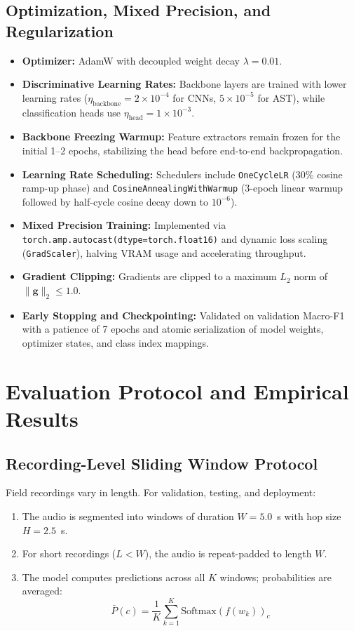 \documentclass[11pt,a4paper]{article}
\begin{document}
\subsection{Optimization, Mixed Precision, and Regularization}
\begin{itemize}[leftmargin=*]
    \item \textbf{Optimizer:} AdamW with decoupled weight decay $\lambda = 0.01$.
    \item \textbf{Discriminative Learning Rates:} Backbone layers are trained with lower learning rates ($\eta_{\text{backbone}} = 2 \times 10^{-4}$ for CNNs, $5 \times 10^{-5}$ for AST), while classification heads use $\eta_{\text{head}} = 1 \times 10^{-3}$.
    \item \textbf{Backbone Freezing Warmup:} Feature extractors remain frozen for the initial 1--2 epochs, stabilizing the head before end-to-end backpropagation.
    \item \textbf{Learning Rate Scheduling:} Schedulers include \texttt{OneCycleLR} (30\% cosine ramp-up phase) and \texttt{CosineAnnealingWithWarmup} (3-epoch linear warmup followed by half-cycle cosine decay down to $10^{-6}$).
    \item \textbf{Mixed Precision Training:} Implemented via \texttt{torch.amp.autocast(dtype=torch.float16)} and dynamic loss scaling (\texttt{GradScaler}), halving VRAM usage and accelerating throughput.
    \item \textbf{Gradient Clipping:} Gradients are clipped to a maximum $L_2$ norm of $\|\mathbf{g}\|_2 \le 1.0$.
    \item \textbf{Early Stopping and Checkpointing:} Validated on validation Macro-F1 with a patience of 7 epochs and atomic serialization of model weights, optimizer states, and class index mappings.
\end{itemize}

\section{Evaluation Protocol and Empirical Results}

\subsection{Recording-Level Sliding Window Protocol}
Field recordings vary in length. For validation, testing, and deployment:
\begin{enumerate}[leftmargin=*]
    \item The audio is segmented into windows of duration $W = 5.0$~s with hop size $H = 2.5$~s.
    \item For short recordings ($L < W$), the audio is repeat-padded to length $W$.
    \item The model computes predictions across all $K$ windows; probabilities are averaged:
    \begin{equation}
        \bar{P}(c) = \frac{1}{K} \sum_{k=1}^K \text{Softmax}(f(w_k))_c
    \end{equation}
\end{enumerate}
\end{document}
